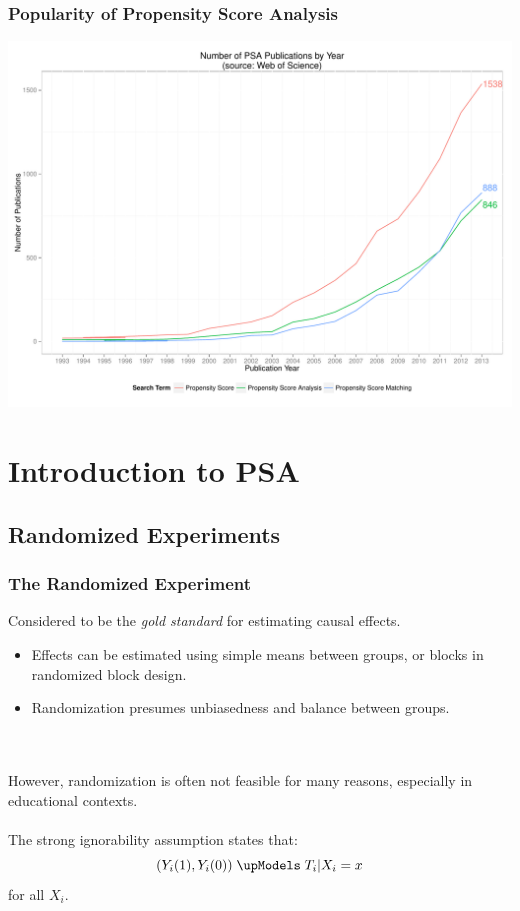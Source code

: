 \documentclass[10pt,slidestop,mathserif,c]{beamer}
\begin{document}
\begin{frame}
    \frametitle{Popularity of Propensity Score Analysis}
    \begin{center}
        \includegraphics{figures/Slides-popularity}
    \end{center}
    

\end{frame}


\section{Introduction to PSA}

\subsection{Randomized Experiments}

\begin{frame}
    \frametitle{The Randomized Experiment}
    
    Considered to be the \textit{gold standard} for estimating causal effects.
    
    \begin{itemize}
        \item Effects can be estimated using simple means between groups, or blocks in randomized block design.
        \item Randomization presumes unbiasedness and balance between groups.
    \end{itemize}
    \ \\ \ \\
    However, randomization is often not feasible for many reasons, especially in educational contexts.
    \pause
    \ \\ \ \\
    The strong ignorability assumption states that:
    $$({ Y }_{ i }(1),{ Y }_{ i }(0)) \; \upModels \; { T }_{ i }|{ X }_{ i }=x$$
    for all ${X}_{i}$.
    
\end{frame}
\end{document}
